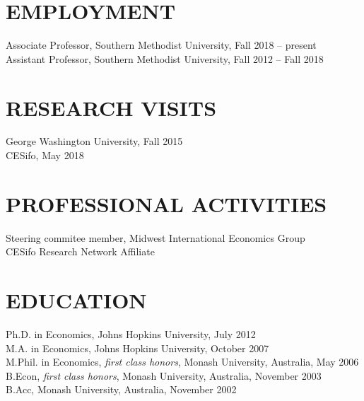 \documentclass[11pt]{res}
\begin{document}
\begin{resume}
\hspace{-0.5in}\makebox[6.1in]{\hrulefill}

\section{EMPLOYMENT} \vspace{1.5mm}
Associate Professor, Southern Methodist University, Fall 2018 -- present\\
Assistant Professor, Southern Methodist University, Fall 2012 -- Fall 2018

\section{RESEARCH VISITS} \vspace{1.5mm}
George Washington University, Fall 2015\vspace{1.5mm}\\
CESifo, May 2018

\section{PROFESSIONAL ACTIVITIES} \vspace{1.5mm}
Steering commitee member, Midwest International Economics Group\\
CESifo Research Network Affiliate

\section{EDUCATION} \vspace{1.5mm}
    Ph.D. in Economics, Johns Hopkins University, July 2012 \vspace{1.5mm}\\
    M.A. in Economics, Johns Hopkins University, October 2007\vspace{1.5mm}\\
    M.Phil. in Economics, \emph{first class honors}, Monash University, Australia, May 2006\vspace{1.5mm}\\
    B.Econ, \emph{first class honors}, Monash University, Australia, November 2003\vspace{1.5mm}\\
    B.Acc, Monash University, Australia, November 2002



\end{resume}
\end{document}
